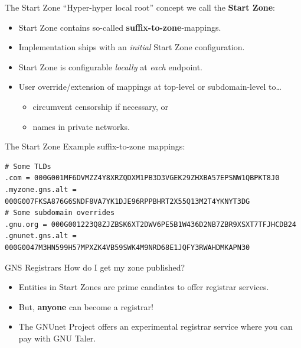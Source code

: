 \documentclass[aspectratio=169]{beamer}
\let\oldemph\textbf
\renewcommand{\textbf}[1]{{\color{mLightBrown}\oldemph{#1}}}
\begin{document}
\begin{frame}[fragile]{The Start Zone}
  ``Hyper-hyper local root'' concept we call the \textbf{Start Zone}:
  \begin{itemize}
    \item Start Zone contains so-called \textbf{suffix-to-zone}-mappings.
    \item Implementation ships with an \emph{initial} Start Zone configuration.
    \item Start Zone is configurable \emph{locally} at \emph{each} endpoint.
    \item User override/extension of mappings at top-level or subdomain-level to\ldots
      \begin{itemize}
        \item circumvent censorship if necessary, or
        \item names in private networks.
      \end{itemize}
  \end{itemize}
\end{frame}

\begin{frame}[fragile]{The Start Zone}
  Example suffix-to-zone mappings:
  \begin{small}
  \begin{verbatim}
# Some TLDs
.com = 000G001MF6DVMZZ4Y8XRZQDXM1PB3D3VGEK29ZHXBA57EPSNW1QBPKT8J0
.myzone.gns.alt = 000G007FKSA876G6SNDF8VA7YK1DJE96RPPBHRT2X55Q13M2T4YKNYT3DG
# Some subdomain overrides
.gnu.org = 000G001223Q8ZJZBSK6XT2DWV6PE5B1W436D2NB7ZBR9XSXT7TFJHCDB24
.gnunet.gns.alt = 000G0047M3HN599H57MPXZK4VB59SWK4M9NRD68E1JQFY3RWAHDMKAPN30
  \end{verbatim}
  \end{small}
\end{frame}

\begin{frame}[fragile]{GNS Registrars}
  How do I get my zone published?
  \begin{itemize}
  \item Entities in Start Zones are prime candiates to offer registrar services.
  \item But, \textbf{anyone} can become a registrar!
  \item The GNUnet Project offers an experimental registrar service where you can pay with GNU Taler.
  \end{itemize}
\end{frame}
\end{document}

